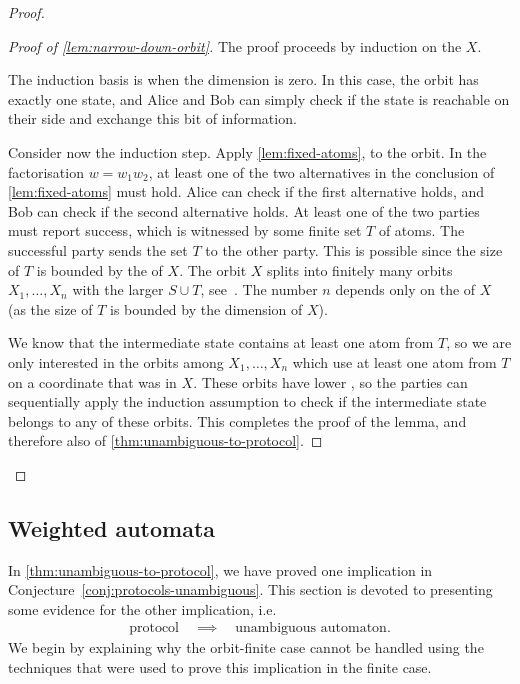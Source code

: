 \begin{proof}
\begin{proof}[Proof of \cref{lem:narrow-down-orbit}]
  The proof proceeds by induction on the  $X$.
    
  The induction basis is when the dimension is zero. In this case, the orbit
  has exactly one state, and Alice and Bob can simply check  if the state is
  reachable on their side and exchange this bit of information.

  Consider now the induction step. Apply \cref{lem:fixed-atoms}, to the
  orbit. In the factorisation $w = w_1 w_2$, at least one of the two
  alternatives in the conclusion of \cref{lem:fixed-atoms} must hold. Alice
  can check if the first alternative holds, and Bob can check if the second
  alternative holds.  At least one of the two parties must report success,
  which is witnessed by some finite set $T$ of atoms. The successful party sends the
  set $T$ to the other party. This is possible since the size of $T$ is
  bounded by the  of $X$. 
  The orbit $X$ splits into finitely many
  orbits $X_1,\ldots,X_n$ with the larger  $S \cup T$, see~\cite[Lemma
  10.9]{bojanczyk_slightly}. The number $n$ depends only on the  
  of $X$ (as the size of $T$ is bounded by the dimension of $X$).

  We know that the intermediate state contains at least one atom from $T$, so
  we are only interested in the orbits among $X_1,\ldots,X_n$ which use at
  least one atom from $T$ on a coordinate that was  in $X$. 
  These orbits
  have lower , so the parties can sequentially apply the induction
  assumption to check if the intermediate state belongs to any of these
  orbits. This completes the proof of the lemma, and therefore also of
  \cref{thm:unambiguous-to-protocol}.
\end{proof}
\end{proof}


\subsection{Weighted automata}
\label{sec:weighted-automata-atoms}

In \cref{thm:unambiguous-to-protocol}, we have proved one implication in Conjecture~\ref{conj:protocols-unambiguous}.
This section is devoted to presenting some evidence for the other implication, i.e.
\begin{align}\label{eq:missing-orbit-finite-implication}
\text{protocol} \quad \implies \quad \text{unambiguous automaton}.
\end{align}
We begin by explaining why the orbit-finite case cannot be handled using the
techniques that were used to prove this implication in the finite case.

